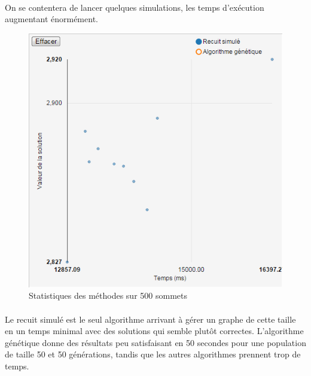 \documentclass[12pt]{article}
\begin{document}
\paragraph{}On se contentera de lancer quelques simulations, les temps d'exécution augmentant énormément.
\begin{figure}[H]
	\begin{center}
	\includegraphics[scale=0.5]{pictures/results/500sommets.png}
	\end{center}
	\caption{Statistiques des méthodes sur 500 sommets \label{fig:100nodeResult}}
\end{figure}
\paragraph{}Le recuit simulé est le seul algorithme arrivant à gérer un graphe de cette taille en un temps minimal avec des solutions qui semble plutôt correctes. L'algorithme génétique donne des résultats peu satisfaisant en 50 secondes pour une population de taille 50 et 50 générations, tandis que les autres algorithmes prennent trop de temps.
\end{document}
